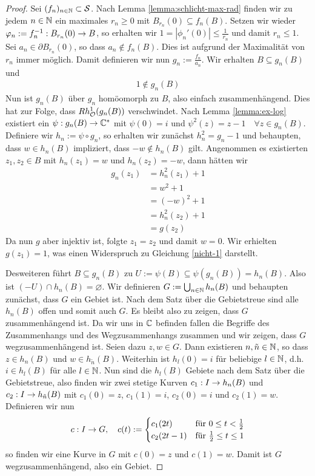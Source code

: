 \begin{proof}
  Sei $(f_n)_{n \in \mathbb{N}} \subset \mathcal{S}$.
  Nach Lemma \ref{lemma:schlicht-max-rad}  finden wir zu jedem $n \in \mathbb{N}$
  ein maximales $r_n \geq 0$ mit $B_{r_n}(0) \subseteq f_n(B)$. Setzen wir
  wieder $\varphi_n:=f_n^{-1} : B_{r_n}(0) \rightarrow B$, so erhalten wir $1 =
  |\phi_n'(0)| \leq \frac{1}{r_n}$ und damit $r_n \leq 1$. \\
  Sei $a_n \in \partial B_{r_n}(0)$, so dass $a_n \notin f_n(B)$. Dies ist
  aufgrund der Maximalität von $r_n$ immer möglich. Damit definieren
  wir nun $g_n := \frac{f_n}{a_n}$. Wir erhalten $B \subseteq g_n(B)$
  und
  \begin{align}
  1 \notin g_n(B) \label{nicht-1}
  \end{align}
  Nun ist $g_n(B)$ über $g_n$ homöomorph zu $B$, also einfach
  zusammenhängend. Dies hat zur Folge, dass $Rh_{\mathcal{O}}^1(g_n(B))$
  verschwindet. 
  Nach Lemma \ref{lemma:ex-log} existiert ein $\psi: g_n(B) \rightarrow \mathbb{C}^\ast$ mit
  $\psi(0) = i$ und $\psi^2(z) = z - 1 \quad \forall z \in g_n(B)$.
  Definiere wir $h_n := \psi \circ g_n$, so erhalten wir zunächst
  $h_n^2 = g_n - 1$ und behaupten, dass $w \in h_n(B)$ impliziert,
  dass $-w \notin h_n(B)$ gilt.
  Angenommen es existierten $z_1,z_2 \in B$ mit $h_n(z_1) = w$ und
  $h_n(z_2) = -w$, dann hätten wir
  \begin{align*}
    g_n(z_1) & = h_n^2(z_1) +1 \\
    & = w^2 +1 \\
    & = (-w)^2 +1 \\
    & = h_n^2(z_2) +1 \\
    & = g(z_2)
  \end{align*}
  Da nun $g$ aber injektiv ist, folgte $z_1 = z_2$ und damit $w =
  0$. Wir erhielten $g(z_1) = 1$, was einen Widerspruch zu Gleichung
  \eqref{nicht-1} darstellt. 

  Desweiteren führt $B \subseteq g_n(B)$ zu $U:= \psi(B) \subseteq
  \psi(g_n(B)) = h_n(B)$. Also ist $(-U) \cap h_n(B) = \varnothing$.
  Wir definieren $G := \bigcup_{n \in \mathbb{N}} h_n(B)$ und behaupten
  zunächst, dass $G$ ein Gebiet ist.
  Nach dem Satz über die Gebietstreue sind alle $h_n(B)$ offen und
  somit auch $G$. Es bleibt also zu zeigen, dass $G$ zusammenhängend
  ist. Da wir uns in $\mathbb{C}$ befinden fallen die Begriffe des
  Zusammenhangs und des Wegzusammenhangs zusammen und wir zeigen, dass
  $G$ wegzusammenhängend ist.
  Seien dazu $z, w \in G$. Dann existieren $n, \tilde n \in \mathbb{N}$, so
  dass $z \in h_n(B)$ und $w \in h_{\tilde n} (B)$. Weiterhin ist
  $h_l(0) = i$ für beliebige $l \in \mathbb{N}$, d.h. $i \in h_l(B)$ für alle
  $l \in \mathbb{N}$. Nun sind die $h_l(B)$ Gebiete nach dem Satz über
  die Gebietstreue, also finden wir zwei stetige Kurven $c_1: I \rightarrow
  h_n(B)$ und $c_2: I \rightarrow h_{\tilde n}(B)$ mit $c_1(0) = z$, $c_1(1) =
  i$, $c_2(0) = i$ und $c_2(1) = w$. Definieren wir nun
  \[
  c: I \rightarrow G, \quad c(t) :=
  \begin{cases}
    c_1(2t) & \text{für } 0 \leq t < \frac12\\
    c_2(2t-1) & \text{für } \frac12 \leq t \leq 1
  \end{cases}
  \]
  so finden wir eine Kurve in $G$ mit $c(0) = z$ und $c(1) = w$. Damit
  ist $G$ wegzusammenhängend, also ein Gebiet.


\end{proof}
